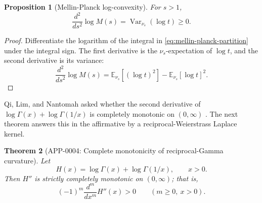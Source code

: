 \documentclass[11pt]{article}
\numberwithin{equation}{section}
\newtheorem{theorem}{Theorem}[section]
\newtheorem{proposition}[theorem]{Proposition}
\theoremstyle{definition}
\theoremstyle{remark}
\DeclareMathOperator{\Var}{Var}
\newcommand{\E}{\mathbb E}
\newcommand{\1}{\mathbf 1}
\begin{document}
\begin{proposition}[Mellin-Planck log-convexity]
\label{prop:mellin-planck-log-convexity}
For \(s>1\),
\begin{equation}
\label{eq:mellin-planck-log-convexity}
\frac{d^2}{ds^2}\log M(s)=\Var_{\nu_s}(\log t)\ge0.
\end{equation}
\end{proposition}

\begin{proof}
Differentiate the logarithm of the integral in \eqref{eq:mellin-planck-partition} under the integral sign.  The first derivative is the \(\nu_s\)-expectation of \(\log t\), and the second derivative is its variance:
\begin{equation}
\label{eq:mellin-planck-variance-proof}
\frac{d^2}{ds^2}\log M(s)
=\E_{\nu_s}[(\log t)^2]-\E_{\nu_s}[\log t]^2.
\end{equation}
\end{proof}

Qi, Lim, and Nantomah asked whether the second derivative of \(\log\Gamma(x)+\log\Gamma(1/x)\) is completely monotonic on \((0,\infty)\) \cite{qi-lim-nantomah-polygamma}.  The next theorem answers this in the affirmative by a reciprocal-Weierstrass Laplace kernel.

\begin{theorem}[APP-0004: Complete monotonicity of reciprocal-Gamma curvature]
\label{thm:reciprocal-gamma-complete-monotonicity}
Let
\begin{equation}
\label{eq:reciprocal-gamma-h}
H(x)=\log\Gamma(x)+\log\Gamma(1/x),\qquad x>0.
\end{equation}
Then \(H''\) is strictly completely monotonic on \((0,\infty)\); that is,
\begin{equation}
\label{eq:reciprocal-gamma-complete-monotonicity}
(-1)^m\frac{d^m}{dx^m}H''(x)>0
\qquad(m\ge0,\ x>0).
\end{equation}
\end{theorem}
\end{document}
